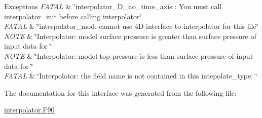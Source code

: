\begin{DoxyExceptions}{Exceptions}
{\em F\+A\+T\+AL} & \char`\"{}interpolator\+\_\+D\+\_\+no\+\_\+time\+\_\+axis \+: You must call
                interpolator\+\_\+init before calling interpolator\char`\"{} \\
\hline
{\em F\+A\+T\+AL} & \char`\"{}interpolator\+\_\+mod\+: cannot use 4\+D interface to
                interpolator for this file\char`\"{} \\
\hline
{\em N\+O\+TE} & \char`\"{}\+Interpolator\+: model surface pressure is greater than
                surface pressure of input data for \char`\"{} \\
\hline
{\em N\+O\+TE} & \char`\"{}\+Interpolator\+: model top pressure is less than surface
                pressure of input data for \char`\"{} \\
\hline
{\em F\+A\+T\+AL} & \char`\"{}\+Interpolator\+: the field name is not contained in this
                intepolate\+\_\+type\+: \char`\"{} \\
\hline
\end{DoxyExceptions}


The documentation for this interface was generated from the following file\+:\begin{DoxyCompactItemize}
\item 
\hyperlink{interpolator_8_f90}{interpolator.\+F90}\end{DoxyCompactItemize}
